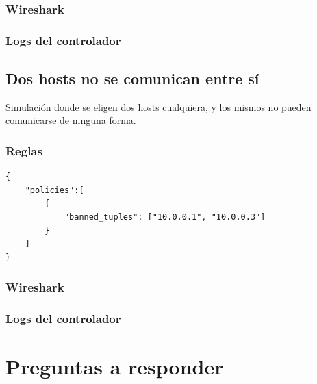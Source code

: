 \documentclass{article}
\begin{document}
\subsubsection{Wireshark}
\begin{center}
\end{center}

\subsubsection{Logs del controlador}
\begin{center}
\end{center}

\subsection{Dos hosts no se comunican entre sí}
Simulación donde se eligen dos hosts cualquiera, y los mismos no pueden comunicarse de ninguna forma.

\subsubsection{Reglas}
\begin{verbatim}
{
    "policies":[
        {
            "banned_tuples": ["10.0.0.1", "10.0.0.3"]
        }
    ]
}
\end{verbatim}

\subsubsection{Wireshark}
\begin{center}
\end{center}

\subsubsection{Logs del controlador}
\begin{center}
\end{center}

\newpage
\section{Preguntas a responder}\label{preguntas-a-responder}
\end{document}
